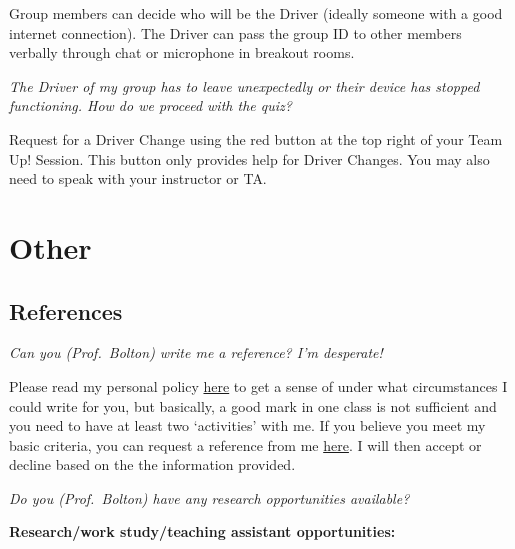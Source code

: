 \documentclass[
]{book}
\begin{document}
Group members can decide who will be the Driver (ideally someone with a good internet connection). The Driver can pass the group ID to other members verbally through chat or microphone in breakout rooms.

\emph{The Driver of my group has to leave unexpectedly or their device has stopped functioning. How do we proceed with the quiz?}

Request for a Driver Change using the red button at the top right of your Team Up! Session. This button only provides help for Driver Changes. You may also need to speak with your instructor or TA.

\hypertarget{other}{%
\section{Other}\label{other}}

\hypertarget{references}{%
\subsection{References}\label{references}}

\emph{Can you (Prof.~Bolton) write me a reference? I'm desperate!}

Please read my personal policy \href{https://www.lizabolton.com/references.html}{here} to get a sense of under what circumstances I could write for you, but basically, a good mark in one class is not sufficient and you need to have at least two `activities' with me. {If you believe you meet my basic criteria, you can request a reference from me \href{https://forms.office.com/r/XHqjGXjCru}{here}.} I will then accept or decline based on the the information provided.

\emph{Do you (Prof.~Bolton) have any research opportunities available?}

\textbf{Research/work study/teaching assistant opportunities:}
\end{document}
